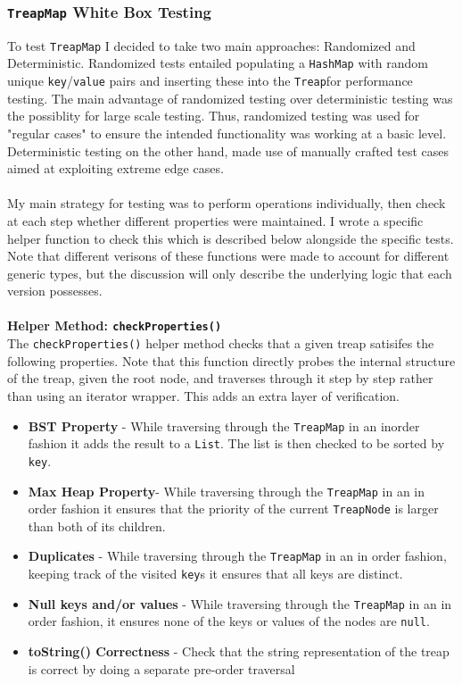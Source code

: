 \documentclass[11pt]{article}
\def\tt{\texttt}
\def\TM{\tt{TreapMap}}
\def\Treap{\tt{Treap}}
\def\tn{\tt{TreapNode}}
\def\key{\tt{key}}
\def\val{\tt{value} }
\begin{document}
\subsubsection{\TM{} White Box Testing}
To test \TM{} I decided to take two main approaches: Randomized and Deterministic. Randomized tests entailed populating a \tt{HashMap} with random unique \key{}/\val{} pairs and inserting these into the \Treap for performance testing. The main advantage of randomized testing over deterministic testing was the possiblity for large scale testing. Thus, randomized testing was used for "regular cases" to ensure the intended functionality was working at a basic level. Deterministic testing on the other hand, made use of manually crafted test cases aimed at exploiting extreme edge cases. \\ \\
My main strategy for testing was to perform operations individually, then check at each step whether different properties were maintained. I wrote a specific helper function to check this which is described below alongside the specific tests. Note that different verisons of these functions were made to account for different generic types, but the discussion will only describe the underlying logic that each version possesses.\\ \\
\textbf{Helper Method: \tt{checkProperties() }}\\ 
The \tt{checkProperties()} helper method checks that a given treap satisifes the following properties. Note that this function directly probes the internal structure of the treap, given the root node, and traverses through it step by step rather than using an iterator wrapper. This adds an extra layer of verification.
\begin{itemize}
	\item \textbf{BST Property} - While traversing through the \TM{} in an inorder fashion it adds the result to a \tt{List}. The list is then checked to be sorted by \key. 
	\item \textbf{Max Heap Property}- While traversing  through the \TM{} in an in order fashion it ensures that the priority of the current \tn{} is larger than both of its children.
	\item \textbf{Duplicates} - While traversing through the \TM{} in an in order fashion, keeping track of the visited \key s it ensures that all keys are distinct.
	\item \textbf{Null keys and/or values} - While traversing through the \TM{} in an in order fashion, it ensures none of the keys or values of the nodes are \tt{null}.
	\item \textbf{toString() Correctness} - Check that the string representation of the treap is correct by doing a separate pre-order traversal
\end{itemize}
\end{document}

